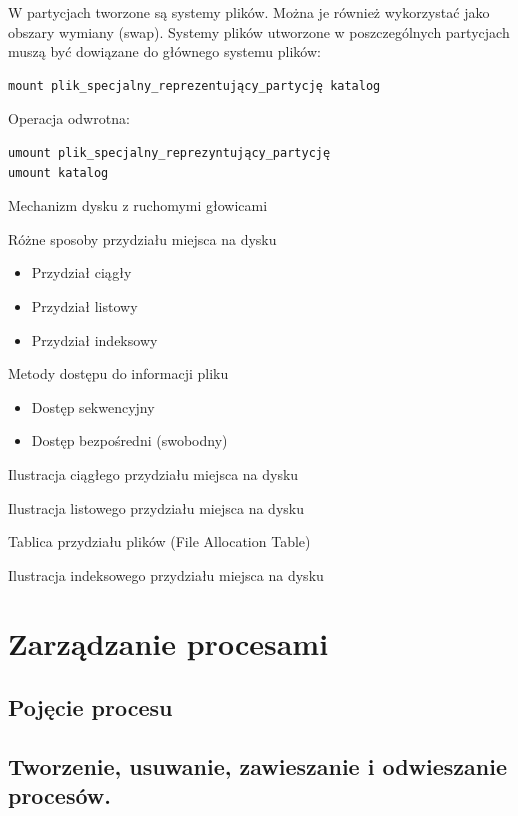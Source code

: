 \documentclass[11pt]{article}
\begin{document}
W partycjach tworzone są systemy plików. Można je również wykorzystać jako obszary
wymiany (swap).
Systemy plików utworzone w poszczególnych partycjach muszą być dowiązane do
głównego systemu plików:

\begin{verbatim}
mount plik_specjalny_reprezentujący_partycję katalog
\end{verbatim}

Operacja odwrotna:

\begin{verbatim}
umount plik_specjalny_reprezyntujący_partycję
umount katalog
\end{verbatim}

Mechanizm dysku z ruchomymi głowicami

Różne sposoby przydziału miejsca na dysku

\begin{itemize}
\item Przydział ciągły
\item Przydział listowy
\item Przydział indeksowy
\end{itemize}

Metody dostępu do informacji pliku
\begin{itemize}
\item Dostęp sekwencyjny
\item Dostęp bezpośredni (swobodny)
\end{itemize}

Ilustracja ciągłego przydziału
miejsca na dysku

Ilustracja listowego przydziału
miejsca na dysku

Tablica przydziału plików (File Allocation Table)

Ilustracja indeksowego przydziału miejsca na dysku



\section{Zarządzanie procesami}

\subsection{Pojęcie procesu}

\subsection{Tworzenie, usuwanie, zawieszanie i odwieszanie procesów.}
\end{document}
